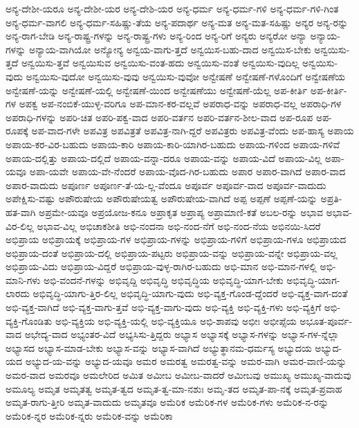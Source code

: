 {ಅನ್ಯ-ದೇಶೀ-ಯರೂ
ಅನ್ಯ-ದೇಶೀ-ಯರ
ಅನ್ಯ-ದೇಶಿ-ಯರ
ಅನ್ಯ-ಧರ್ಮ
ಅನ್ಯ-ಧರ್ಮ-ಗಳಿ
ಅನ್ಯ-ಧರ್ಮ-ಗಳಿ-ಗಿಂತ
ಅನ್ಯ-ಧರ್ಮ-ವಾಗಲಿ
ಅನ್ಯ-ಧರ್ಮ-ಸಹಿಷ್ಣು-ತೆಯ
ಅನ್ಯ-ಪದಾರ್ಥ
ಅನ್ಯ-ಮತ
ಅನ್ಯ-ಮತ-ಸಹಿಷ್ಣು
ಅನ್ಯರ
ಅನ್ಯ-ರನ್ನು
ಅನ್ಯ-ರಾಗ-ಬೇಡಿ
ಅನ್ಯ-ರಾಷ್ಟ್ರ-ಗಳನ್ನು
ಅನ್ಯ-ರಾಷ್ಟ್ರ-ಗಳು
ಅನ್ಯ-ರಿಂದ
ಅನ್ಯ-ರಿಗೆ
ಅನ್ಯರು
ಅನ್ಯರೋ
ಅನ್ಯಾ
ಅನ್ಯಾಯ-ಗಳನ್ನು
ಅನ್ಯಾಯ-ವಾಗಿಯೋ
ಅನ್ಯೋನ್ಯ
ಅನ್ವಯ-ವಾಗು-ತ್ತದೆ
ಅನ್ವಯಿಸ-ಬಹು-ದಾದ
ಅನ್ವಯಿಸ-ಬೇಕು
ಅನ್ವಯಿಸು-ತ್ತದೆ
ಅನ್ವಯಿಸು-ತ್ತವೆ
ಅನ್ವಯಿಸುವ
ಅನ್ವಯಿಸು-ವಂತ-ಹದು
ಅನ್ವಯಿಸು-ವಂತೆ
ಅನ್ವಯಿಸು-ವುದಿಲ್ಲ
ಅನ್ವಯಿಸು-ವುದು
ಅನ್ವಯಿಸು-ವುದೋ
ಅನ್ವಯಿಸು-ವುವು
ಅನ್ವಯಿಸು-ವುವೋ
ಅನ್ವೇಷಣೆ
ಅನ್ವೇಷಣೆ-ಗಳೊಂದಿಗೆ
ಅನ್ವೇಷಣೆಯ
ಅನ್ವೇಷಣೆ-ಯನ್ನು
ಅನ್ವೇಷಣೆ-ಯಲ್ಲಿ
ಅನ್ವೇಷಣೆ-ಯಿಂದ
ಅನ್ವೇಷಣೆಯು
ಅನ್ವೇಷಣೆ-ಯೆಲ್ಲ
ಅಪ-ಕೀರ್ತಿ
ಅಪ-ಕೀರ್ತಿ-ಗಳ
ಅಪಕ್ವ
ಅಪ-ನಂಬಿಕೆ-ಯುಳ್ಳ-ವರಿಗೂ
ಅಪ-ಮಾನ-ಕರ-ವಲ್ಲವೆ
ಅಪರಾಧ-ವನ್ನು
ಅಪರಾಧ-ವಲ್ಲ
ಅಪರಾಧಿ-ಗಳ
ಅಪರಾಧಿ-ಗಳನ್ನು
ಅಪರಿ-ಚಿತ
ಅಪರಿ-ಪಕ್ವ-ವಾದ
ಅಪರಿ-ವರ್ತನ
ಅಪರಿ-ವರ್ತನ-ಶೀಲ-ವಾದ
ಅಪ-ರೂಪ
ಅಪ-ರೂಪಕ್ಕೆ
ಅಪ-ವಾದ-ಗಳೇ
ಅಪವಿತ್ರ
ಅಪವಿತ್ರತೆ
ಅಪವಿತ್ರ-ನಾಗಿ-ದ್ದರೆ
ಅಪವಿತ್ರರು
ಅಪವಿತ್ರ-ವೆಂದು
ಅಪ-ಹಾಸ್ಯ
ಅಪಾಯ
ಅಪಾಯ-ಕರ-ವಿರ-ಬಹುದು
ಅಪಾಯ-ಕಾರಿ
ಅಪಾಯ-ಕಾರಿ-ಯಾಗಿರ-ಬಹುದು
ಅಪಾಯ-ಗಳಿಂದ
ಅಪಾಯ-ಗಳಿವೆ
ಅಪಾಯ-ದಲ್ಲಿತ್ತು
ಅಪಾಯ-ದಲ್ಲಿದೆ
ಅಪಾಯ-ವನ್ನಾ-ದರೂ
ಅಪಾಯ-ವನ್ನು
ಅಪಾಯ-ವಿದೆ
ಅಪಾಯ-ವಿಲ್ಲ
ಅಪಾ-ಯವೂ
ಅಪಾ-ಯವೇ
ಅಪಾಯ-ವೇ-ನೆಂದರೆ
ಅಪಾಯ-ವೊದ-ಗಿರ-ಬಹುದು
ಅಪಾರ
ಅಪಾರ-ವಾಗಿದೆ
ಅಪಾರ-ವಾದ
ಅಪಾರ-ವಾದುದು
ಅಪೂರ್ಣ
ಅಪೂರ್ಣ-ತೆ-ಯ-ಲ್ಲ-ವೆಂದೂ
ಅಪೂರ್ವ
ಅಪೂರ್ವ-ವಾದ
ಅಪೂರ್ವ-ವಾದುದು
ಅಪೇಕ್ಷಿಸು-ವಷ್ಟು
ಅಪೌರುಷೇಯ
ಅಪೌರುಷೇಯತ್ವ
ಅಪೌರುಷೇಯ-ವಾಗಿದೆ
ಅಪ್ಪ
ಅಪ್ಪಣೆ
ಅಪ್ಪಣೆ-ಯನ್ನು
ಅಪ್ರತಿ-ಹತ-ವಾಗಿ
ಅಪ್ರಮೇ-ಯವೂ
ಅಪ್ರಯೋಜ-ಕನೂ
ಅಪ್ರಾಕೃತ
ಅಪ್ರಾಪ್ಯ
ಅಪ್ರಾಮಾಣಿ-ಕತೆ
ಅಬಲ-ರನ್ನು
ಅಭಾವ
ಅಭಾವ-ವಿರ-ಲಿಲ್ಲ
ಅಭಾವ-ವಿಲ್ಲ
ಅಭಿಚಾಕಶೀತಿ
ಅಭಿ-ನಂದನಾ
ಅಭಿ-ನಂದ-ನೆಗೆ
ಅಭಿ-ನಂದ-ನೆಯ
ಅಭಿನಯಿ-ಸಿದರೆ
ಅಭಿಪ್ರಾಯ
ಅಭಿಪ್ರಾಯಕ್ಕೆ
ಅಭಿಪ್ರಾಯ-ಗಳ
ಅಭಿಪ್ರಾಯ-ಗಳನ್ನು
ಅಭಿಪ್ರಾಯ-ಗಳಿಗೆ
ಅಭಿಪ್ರಾಯ-ಗಳೂ
ಅಭಿಪ್ರಾಯದ
ಅಭಿಪ್ರಾಯ-ದಂತೆ
ಅಭಿಪ್ರಾಯ-ದಲ್ಲಿ
ಅಭಿಪ್ರಾಯ-ಪಟ್ಟರು
ಅಭಿಪ್ರಾಯ-ವನ್ನು
ಅಭಿಪ್ರಾಯ-ವನ್ನೇ
ಅಭಿಪ್ರಾಯ-ವಲ್ಲ
ಅಭಿಪ್ರಾಯ-ವಿದು
ಅಭಿಪ್ರಾಯ-ವಿದ್ದರೆ
ಅಭಿಪ್ರಾಯ-ವುಳ್ಳ-ರಾಗಿರ-ಬಹುದು
ಅಭಿ-ಮಾನ
ಅಭಿ-ಮಾನ-ಗಳಲ್ಲಿ
ಅಭಿ-ಮಾನಿ-ಗಳು
ಅಭಿ-ವಂದನೆ-ಗಳನ್ನು
ಅಭಿವೃದ್ದಿ
ಅಭಿವೃದ್ಧಿ
ಅಭಿವೃದ್ಧಿಯ
ಅಭಿವೃದ್ಧಿ-ಯಾಗ-ಬೇಕು
ಅಭಿವೃದ್ಧಿ-ಯಾಗ-ಲಾರದು
ಅಭಿವೃದ್ಧಿ-ಯಾಗು-ತ್ತಿರ-ಲಿಲ್ಲ
ಅಭಿವೃದ್ಧಿ-ಯಾಗು-ವುದು
ಅಭಿ-ವ್ಯಕ್ತ-ಗೊಂಡ-ದ್ದೆಂದರೆ
ಅಭಿ-ವ್ಯಕ್ತ-ವಾಗ-ದಂತೆ
ಅಭಿ-ವ್ಯಕ್ತ-ವಾಗಿದೆ
ಅಭಿ-ವ್ಯಕ್ತ-ವಾಗು-ತ್ತವೆ
ಅಭಿ-ವ್ಯಕ್ತ-ವಾಗು-ವುದು
ಅಭಿ-ವ್ಯಕ್ತಿ
ಅಭಿ-ವ್ಯಕ್ತಿ-ಗಳು
ಅಭಿ-ವ್ಯಕ್ತಿಗೆ
ಅಭಿ-ವ್ಯಕ್ತಿ-ಗೊಂಡಿತು
ಅಭಿ-ವ್ಯಕ್ತಿಯ
ಅಭಿ-ವ್ಯಕ್ತಿ-ಯಲ್ಲಿ
ಅಭಿ-ವ್ಯಕ್ತಿಯೂ
ಅಭಿ-ಶಾಪವು
ಅಭೀಃ
ಅಭೀಪ್ಸೆಯ
ಅಭೂತ-ಪೂರ್ವ-ವಾದ
ಅಭೇದ್ಯ-ವಾದ
ಅಭ್ಯಂತರ-ವಿದೆ
ಅಭ್ಯಸಿಸು-ತ್ತಿದ್ದರು
ಅಭ್ಯಾಸ
ಅಭ್ಯಾಸಕ್ಕೆ
ಅಭ್ಯಾಸ-ಗಳನ್ನು
ಅಭ್ಯಾಸ-ಗಳ-ನ್ನೆಲ್ಲಾ
ಅಭ್ಯಾಸದ
ಅಭ್ಯಾಸ-ಮಾಡ-ಬೇಕು
ಅಭ್ಯಾಸ-ವನ್ನು
ಅಭ್ಯಾಸ-ವಾಗಿದೆ
ಅಭ್ಯುತ್ಥಾನಮ-ಧರ್ಮಸ್ಯ
ಅಭ್ಯುದಯ
ಅಭ್ಯುದ-ಯದ
ಅಭ್ಯುದ-ಯ-ವನ್ನು
ಅಭ್ಯುದ-ಯವೂ
ಅಮರ
ಅಮರತ್ವ
ಅಮರತ್ವ-ವನ್ನು
ಅಮರ-ವಾಗಿ
ಅಮರ-ವಾಣಿ-ಯನ್ನು
ಅಮರ-ವಾದ
ಅಮರವೂ
ಅಮಲೇರಿದ
ಅಮಿತ
ಅಮೀಬ
ಅಮೀಬ-ವಾದರೆ
ಅಮೀಬವು
ಅಮುಖ್ಯ
ಅಮುಖ್ಯ-ವಾದುವು
ಅಮೂಲ್ಯ
ಅಮೃತ
ಅಮೃತತ್ವ
ಅಮೃತ-ತ್ವದ
ಅಮೃತ-ತ್ವ-ಮಾ-ನಶುಃ
ಅಮೃ-ತದ
ಅಮೃತ-ಪಾ-ನಕ್ಕೆ
ಅಮೃತ-ಪ್ರವಾಹ
ಅಮೃತ-ರಾಗು-ತ್ತೀರಿ
ಅಮೃತ-ವಾದುದು
ಅಮೃತವೂ
ಅಮೆರಿಕ
ಅಮೆರಿಕ-ಗಳ
ಅಮೆರಿಕ-ಗಳು
ಅಮೆರಿಕ-ನ-ರನ್ನು
ಅಮೆರಿಕ-ನ್ನರ
ಅಮೆರಿಕ-ನ್ನರು
ಅಮೆರಿಕ-ವನ್ನು
ಅಮೆರಿಕಾ
}
